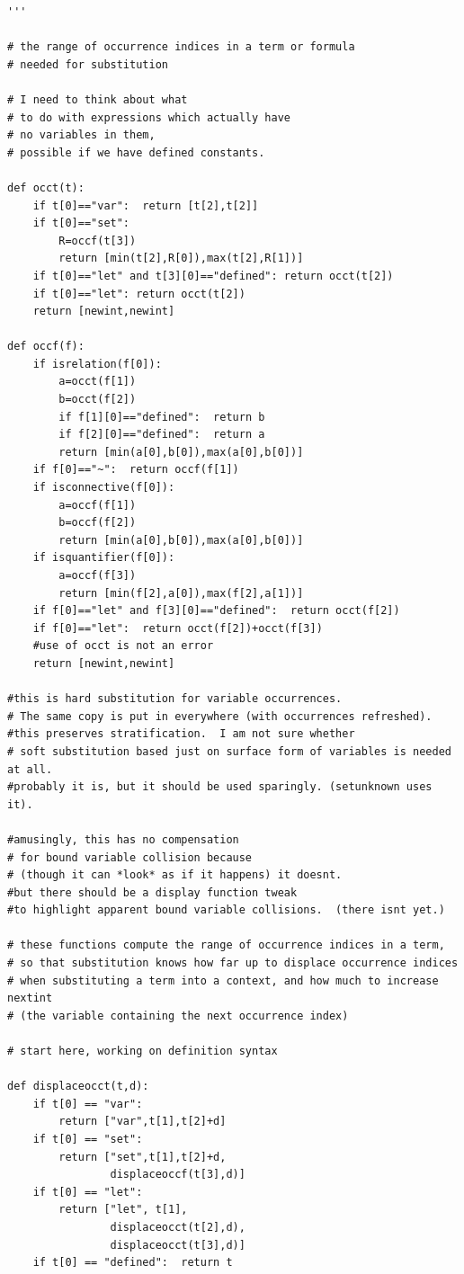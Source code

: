 \documentclass{article}
\begin{document}
\begin{verbatim}
'''

# the range of occurrence indices in a term or formula
# needed for substitution

# I need to think about what
# to do with expressions which actually have
# no variables in them,
# possible if we have defined constants.

def occt(t):
    if t[0]=="var":  return [t[2],t[2]]
    if t[0]=="set":
        R=occf(t[3])
        return [min(t[2],R[0]),max(t[2],R[1])]
    if t[0]=="let" and t[3][0]=="defined": return occt(t[2])
    if t[0]=="let": return occt(t[2])
    return [newint,newint]

def occf(f):
    if isrelation(f[0]):
        a=occt(f[1])
        b=occt(f[2])
        if f[1][0]=="defined":  return b
        if f[2][0]=="defined":  return a
        return [min(a[0],b[0]),max(a[0],b[0])]
    if f[0]=="~":  return occf(f[1])
    if isconnective(f[0]):
        a=occf(f[1])
        b=occf(f[2])
        return [min(a[0],b[0]),max(a[0],b[0])]
    if isquantifier(f[0]):
        a=occf(f[3])
        return [min(f[2],a[0]),max(f[2],a[1])]
    if f[0]=="let" and f[3][0]=="defined":  return occt(f[2])
    if f[0]=="let":  return occt(f[2])+occt(f[3])
    #use of occt is not an error
    return [newint,newint]

#this is hard substitution for variable occurrences.
# The same copy is put in everywhere (with occurrences refreshed).
#this preserves stratification.  I am not sure whether
# soft substitution based just on surface form of variables is needed at all.
#probably it is, but it should be used sparingly. (setunknown uses it).

#amusingly, this has no compensation
# for bound variable collision because
# (though it can *look* as if it happens) it doesnt.
#but there should be a display function tweak
#to highlight apparent bound variable collisions.  (there isnt yet.)

# these functions compute the range of occurrence indices in a term,
# so that substitution knows how far up to displace occurrence indices
# when substituting a term into a context, and how much to increase nextint
# (the variable containing the next occurrence index)

# start here, working on definition syntax

def displaceocct(t,d):
    if t[0] == "var":
        return ["var",t[1],t[2]+d]
    if t[0] == "set":
        return ["set",t[1],t[2]+d,
                displaceoccf(t[3],d)]
    if t[0] == "let":
        return ["let", t[1],
                displaceocct(t[2],d),
                displaceocct(t[3],d)]
    if t[0] == "defined":  return t


\end{verbatim}
\end{document}
